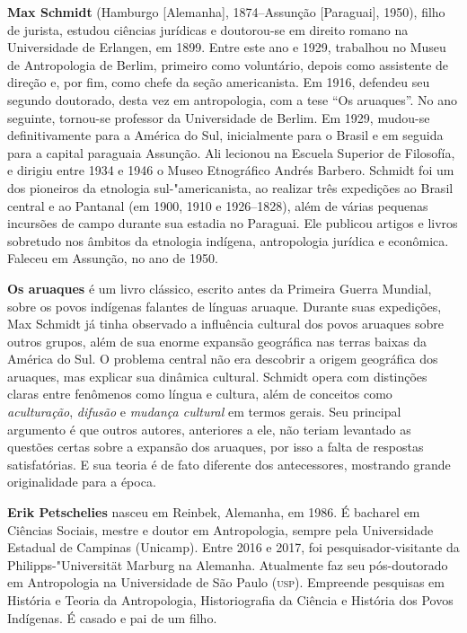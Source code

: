 \textbf{Max Schmidt} (Hamburgo {[}Alemanha{]}, 1874--Assunção {[}Paraguai{]}, 1950), filho de jurista, estudou ciências jurídicas e doutorou-se em direito romano na Universidade de Erlangen, em 1899. Entre este ano e 1929, trabalhou no Museu de Antropologia de Berlim, primeiro como voluntário, depois como assistente de direção e, por fim, como chefe da seção americanista. Em 1916, defendeu seu segundo doutorado, desta vez em antropologia, com a tese ``Os aruaques''. No ano seguinte, tornou-se professor da Universidade de Berlim. Em 1929, mudou-se definitivamente para a América do Sul, inicialmente para o Brasil e em seguida para a capital paraguaia Assunção. Ali lecionou na Escuela Superior de Filosofía, e dirigiu entre 1934 e 1946 o Museo Etnográfico Andrés Barbero. Schmidt foi um dos pioneiros da etnologia sul-"americanista, ao realizar três expedições ao Brasil central e ao Pantanal (em 1900, 1910 e 1926--1828), além de várias pequenas incursões de campo durante sua estadia no Paraguai. Ele publicou artigos e livros sobretudo nos âmbitos da etnologia indígena, antropologia jurídica e econômica. Faleceu em Assunção, no ano de 1950.

\textbf{Os aruaques} é um livro clássico, escrito antes da Primeira Guerra Mundial, sobre os povos indígenas falantes de línguas aruaque. Durante suas expedições, Max Schmidt já tinha observado a influência cultural dos povos aruaques sobre outros grupos, além de sua enorme expansão geográfica nas terras baixas da América do Sul. O problema central não era descobrir a origem geográfica dos aruaques, mas explicar sua dinâmica cultural. Schmidt opera com distinções claras entre fenômenos como língua e cultura, além de conceitos como \textit{aculturação}, \textit{difusão} e \textit{mudança cultural} em termos gerais. Seu principal argumento é que outros autores, anteriores a ele, não teriam levantado as questões certas sobre a expansão dos aruaques, por isso a falta de respostas satisfatórias. E sua teoria é de fato diferente dos antecessores, mostrando grande originalidade para a época.

\pagebreak

\textbf{Erik Petschelies} nasceu em Reinbek, Alemanha, em 1986. É bacharel em Ciências Sociais, mestre e doutor em Antropologia, sempre pela Universidade Estadual de Campinas (Unicamp). Entre 2016 e 2017, foi pesquisador-visitante da Philipps-"Universität Marburg na Alemanha. Atualmente faz seu pós-doutorado em Antropologia na Universidade de São Paulo (\textsc{usp}). Empreende pesquisas em História e Teoria da Antropologia, Historiografia da Ciência e História dos Povos Indígenas. É casado e pai de um filho.

